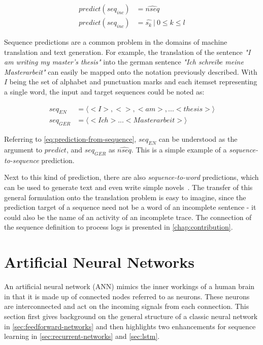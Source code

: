 \begin{equation}
\begin{split}
    predict(seq_{inc}) &= \widehat{nseq}\\
    predict(seq_{inc}) &= \hat{s_k}\ |\ 0 \leq k \leq l
\end{split}
\label{eq:prediction-from-sequence}
\end{equation}

Sequence predictions are a common problem in the domains of machine translation and text generation. For example, the translation of the sentence \textit{"I am writing my master's thesis"} into the german sentence \textit{"Ich schreibe meine Masterarbeit"} can easily be mapped onto the notation previously described. With $I$ being the set of alphabet and punctuation marks and each itemset representing a single word, the input and target sequences could be noted as:

\begin{equation*}
\begin{split}
seq_{EN} &= \langle<I>, < >, <am>, ... <thesis>\rangle\\
seq_{GER} &= \langle<Ich> ... <Masterarbeit>\rangle
\end{split}
\end{equation*}

Referring to \autoref{eq:prediction-from-sequence}, $seq_{EN}$ can be understood as the argument to $predict$, and $seq_{GER}$ as $\widehat{nseq}$. This is a simple example of a \textit{sequence-to-sequence} prediction.

Next to this kind of prediction, there are also \textit{sequence-to-word} predictions, which can be used to generate text and even write simple novels~\cite{web:text-generation-machinelearningmastery, web:text-generation-freecodecamp}. The transfer of this general formulation onto the translation problem is easy to imagine, since the prediction target of a sequence need not be a word of an incomplete sentence - it could also be the name of an activity of an incomplete trace. The connection of the sequence definition to process logs is presented in \autoref{chap:contribution}.

\section{Artificial Neural Networks}\label{sec:artificial-neural-networks}
An artificial neural network (ANN) mimics the inner workings of a human brain in that it is made up of connected nodes referred to as neurons. These neurons are interconnected and act on the incoming signals from each connection. This section first gives background on the general structure of a classic neural network in \autoref{sec:feedforward-networks} and then highlights two enhancements for sequence learning in \autoref{sec:recurrent-networks} and \autoref{sec:lstm}.

